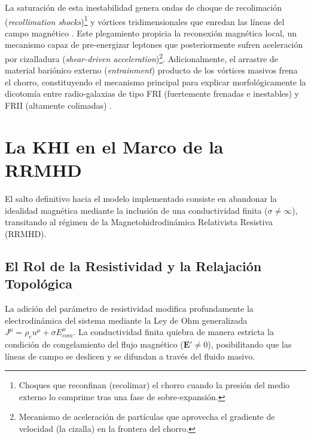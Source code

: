 La saturación de esta inestabilidad genera ondas de choque de recolimación (\textit{recollimation shocks})\footnote{Choques que reconfinan (recolimar) el chorro cuando la presión del medio externo lo comprime tras una fase de sobre-expansión.} y vórtices tridimensionales que enredan las líneas del campo magnético \parencite{bucciantini-2006}. Este plegamiento propicia la reconexión magnética local, un mecanismo capaz de pre-energizar leptones que posteriormente sufren aceleración por cizalladura (\textit{shear-driven acceleration})\footnote{Mecanismo de aceleración de partículas que aprovecha el gradiente de velocidad (la cizalla) en la frontera del chorro.}. Adicionalmente, el arrastre de material bariónico externo (\textit{entrainment}) producto de los vórtices masivos frena el chorro, constituyendo el mecanismo principal para explicar morfológicamente la dicotomía entre radio-galaxias de tipo FRI (fuertemente frenadas e inestables) y FRII (altamente colimadas) \parencite{osmanov-2008}.

\section{La KHI en el Marco de la RRMHD}
\label{sec:khi_rrmhd}

\primerparrafo El salto definitivo hacia el modelo implementado consiste en abandonar la idealidad magnética mediante la inclusión de una conductividad finita ($\sigma \neq \infty$), transitando al régimen de la Magnetohidrodinámica Relativista Resistiva (RRMHD).

\subsection{El Rol de la Resistividad y la Relajación Topológica}
\label{subsec:khi_rrmhd_res}

\primerparrafo La adición del parámetro de resistividad modifica profundamente la electrodinámica del sistema mediante la Ley de Ohm generalizada $J^\mu = \rho_e u^\mu + \sigma E^\mu_{com}$. La conductividad finita quiebra de manera estricta la condición de congelamiento del flujo magnético ($\mathbf{E}' \neq 0$), posibilitando que las líneas de campo se deslicen y se difundan a través del fluido masivo. 

